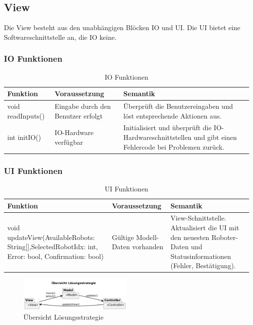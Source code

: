 \clearpage
\subsection{View}
Die View besteht aus den unabhängigen Blöcken IO und UI. Die UI bietet eine Softwareschnittstelle an, die IO keine.

\subsubsection{IO Funktionen}
\begin{table}[h!]
    \centering
    \begin{tabular}{|p{5cm}|p{5cm}|p{5cm}|}
        \hline
        \textbf{Funktion} & \textbf{Voraussetzung} & \textbf{Semantik} \\
        \hline
        void readInputs() & Eingabe durch den Benutzer erfolgt & Überprüft die Benutzereingaben und löst entsprechende Aktionen aus. \\
        \hline
        int initIO() & IO-Hardware verfügbar & Initialisiert und überprüft die IO-Hardwareschnittstellen und gibt einen Fehlercode bei Problemen zurück. \\
        \hline
    \end{tabular}
    \caption{IO Funktionen}
    \label{tab:IOFunktionen}
\end{table}

\subsubsection{UI Funktionen}
\begin{table}[h!]
    \centering
    \begin{tabular}{|p{5cm}|p{5cm}|p{5cm}|}
        \hline
        \textbf{Funktion} & \textbf{Voraussetzung} & \textbf{Semantik} \\
        \hline
        void updateView(AvailableRobots: String[],SelectedRobotIdx: int, Error: bool, Confirmation: bool) & Gültige Modell-Daten vorhanden & View-Schnittstelle. Aktualisiert die UI mit den neuesten Roboter-Daten und Statusinformationen (Fehler, Bestätigung). \\ 
        \hline
    \end{tabular}
    \caption{UI Funktionen}
    \label{tab:UIFunktionen}
\end{table}

\begin{figure}[h]
  \centering
  \includegraphics[width=0.5\textwidth]{diagrams/Übersicht_Lösungsstrategie.png}
  \caption{Übersicht Lösungsstrategie}
  \label{fig:baustein}
\end{figure}







